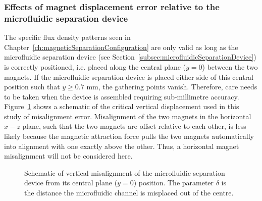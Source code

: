 \subsubsection{Effects of magnet displacement error relative to the microfluidic separation device}
\label{subsec:effectsOfMagnetMisalignment}
The specific flux density patterns seen in Chapter~\ref{ch:magneticSeparationConfiguration} are only valid as long as the microfluidic separation device (see Section~\ref{subsec:microfluidicSeparationDevice}) is correctly positioned, i.e. placed along the central plane ($y=0$) between the two magnets. If the microfluidic separation device is placed either side of this central position such that $y \geq 0.7$ mm, the gathering points vanish. Therefore, care needs to be taken when the device is assembled requiring sub-millimetre accuracy. Figure~\ref{fig:doubleMagnetConfigurationMisalignment} shows a schematic of the critical vertical displacement used in this study of misalignment error. Misalignment of the two magnets in the horizontal $x-z$ plane, such that the two magnets are offset relative to each other, is less likely because the magnetic attraction force pulls the two magnets automatically into alignment with one exactly above the other. Thus, a horizontal magnet misalignment will not be considered here.

\begin{figure}[htb]
\centering
{}
\caption[Schematic of vertical misalignment of the microfluidic separation device]{Schematic of vertical misalignment of the microfluidic separation device from its central plane ($y=0$) position. The parameter $\delta$ is the distance the microfluidic channel is misplaced out of the centre.}
\label{fig:doubleMagnetConfigurationMisalignment}%
\end{figure}

